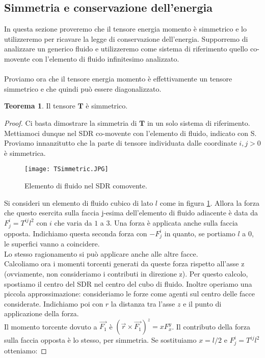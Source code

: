 \documentclass[]{report}
\theoremstyle{definition}
\theoremstyle{Theorem}
\newtheorem{Theo}[Def]{Teorema}
\theoremstyle{definition}
\theoremstyle{definition}
\theoremstyle{definition}
\begin{document}
\subsection{Simmetria e conservazione dell'energia}
In questa sezione proveremo che il tensore energia momento è simmetrico e lo utilizzeremo per ricavare la legge di conservazione dell'energia. Supporremo di analizzare un generico fluido e utilizzeremo come sistema di riferimento quello co-movente con l'elemento di fluido infinitesimo analizzato.\\ \\
Proviamo ora che il tensore energia momento è effettivamente un tensore simmetrico e che quindi può essere diagonalizzato.
\begin{Theo}
	Il tensore $\textbf{T}$ è simmetrico.
\end{Theo}
\begin{proof}
	Ci basta dimostrare la simmetria di $\textbf{T}$ in un solo sistema di riferimento. Mettiamoci dunque nel SDR co-movente con l'elemento di fluido, indicato con S. Proviamo innanzitutto che la parte di tensore individuata dalle coordinate $i,j>0$ è simmetrica.
		\begin{figure} [H]
			\centering
			\label{Image 1}
			\texttt{[image: TSimmetric.JPG]}
	\caption{Elemento di fluido nel SDR comovente.}	
	\end{figure}
	Si consideri un elemento di fluido cubico di lato $l$ come in figura \ref{Image 1}. Allora la forza che questo esercita sulla faccia j-esima dell'elemento di fluido adiacente è data da $F^i_j=T^{ij}l^2$ con $i$ che varia da $1$ a 3. Una forza è applicata anche sulla faccia opposta. Indichiamo questa seconda forza con $-F^i_j$ in quanto, se portiamo $l$ a 0, le superfici vanno a coincidere.\\
	Lo stesso ragionamento si può applicare anche alle altre facce. \\
	Calcoliamo ora i momenti torcenti generati da queste forza rispetto all'asse z (ovviamente, non consideriamo i contributi in direzione z). Per questo calcolo, spostiamo il centro del SDR nel centro del cubo di fluido. Inoltre operiamo una piccola approssimazione: consideriamo le forze come agenti sul centro delle facce considerate. Indichiamo poi con $r$ la distanza tra l'asse $z$ e il punto di applicazione della forza.\\
	Il momento torcente dovuto a $\vec{F_1}$ è $(\vec{r}\times\vec{F_1})^z=xF_x^y$. Il contributo della forza sulla faccia opposta è lo stesso, per simmetria.
	Se sostituiamo $x=l/2$ e $F^i_j=T^{ij}l^2$ otteniamo:

\end{proof}
\end{document}
